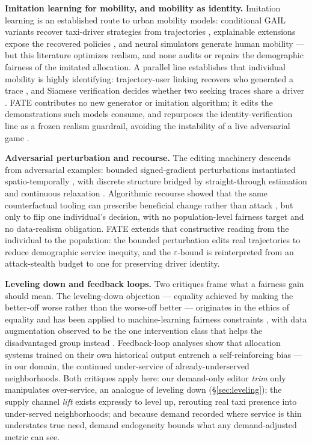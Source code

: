 \textbf{Imitation learning for mobility, and mobility as identity.}
Imitation learning is an established route to urban mobility models:
conditional GAIL variants recover taxi-driver strategies from trajectories
\cite{zhang2019cgail,zhang2022cgail}, explainable extensions expose the
recovered policies \cite{pan2020xgail}, and neural simulators generate human
mobility \cite{feng2020simulate} --- but this literature optimizes realism, and
none audits or repairs the demographic fairness of the imitated allocation. A parallel line establishes that individual mobility is
highly identifying: trajectory-user linking recovers who generated a trace
\cite{gao2017tuler,zhou2018tulvae,miao2020deeptul}, and Siamese verification
decides whether two seeking traces share a driver \cite{ren2020stsiamese}.
FATE contributes no new generator or imitation algorithm; it edits the
demonstrations such models consume, and repurposes the identity-verification
line as a frozen realism guardrail, avoiding the instability of a live
adversarial game \cite{hoermon2016}.

\textbf{Adversarial perturbation and recourse.} The editing machinery
descends from adversarial examples: bounded signed-gradient perturbations
\cite{goodfellow2015fgsm,kurakin2017ifgsm} instantiated spatio-temporally
\cite{hu2023stifgsm}, with discrete structure bridged by straight-through
estimation \cite{bengio2013ste} and continuous
relaxation \cite{jang2017gumbel,maddison2017concrete}. Algorithmic recourse showed that the same
counterfactual tooling can prescribe beneficial change rather than attack
\cite{ustun2019recourse,wachter2018counterfactual}, but only to flip one
individual's decision, with no population-level fairness target and no
data-realism obligation. FATE extends that
constructive reading from the individual to the population: the bounded
perturbation edits real trajectories to reduce demographic service inequity,
and the $\varepsilon$-bound is reinterpreted from an attack-stealth budget to
one for preserving driver identity.

\textbf{Leveling down and feedback loops.} Two critiques frame what a
fairness gain should mean. The leveling-down objection --- equality achieved
by making the better-off worse rather than the worse-off better --- originates
in the ethics of equality \cite{parfit1997} and has been applied to
machine-learning fairness constraints \cite{mittelstadt2024}, with data
augmentation observed to be the one intervention class that helps the
disadvantaged group instead \cite{zietlow2022}. Feedback-loop analyses show
that allocation systems trained on their own historical output entrench a
self-reinforcing bias \cite{ensign2018,lumisaac2016} --- in our domain, the
continued under-service of already-underserved neighborhoods. Both critiques
apply here: our demand-only editor \emph{trim} only manipulates
over-service, an analogue of leveling down (\S\ref{sec:leveling}); the
supply channel \emph{lift} exists expressly to level up, rerouting real
taxi presence into under-served neighborhoods; and because demand recorded
where service is thin understates true need, demand endogeneity bounds
what any demand-adjusted metric can see.
